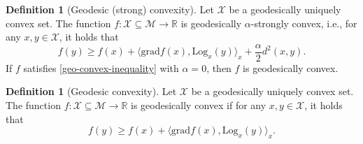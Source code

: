 \documentclass{article}
\newcommand{\rgrad}{\mathrm{grad}}
\newcommand{\Log}{\mathrm{Log}}
\theoremstyle{plain}
\theoremstyle{definition}
\newtheorem{definition}[theorem]{Definition}
\theoremstyle{remark}
\begin{document}
\begin{definition}[Geodesic (strong) convexity]\label{as:strongcon}
Let $\mathcal{X}$ be a geodesically uniquely convex set. The function $f : \mathcal{X}\subseteq\mathcal{M} \to \mathbb{R}$ is geodesically $\alpha$-strongly convex, i.e., for any $x, y \in \mathcal{X}$, it holds that
\begin{equation}\label{geo-convex-inequality}
f(y) \geq f(x) + \langle \rgrad f(x), \Log_x(y) \rangle_x + \frac{\alpha}{2} d^2(x, y).
\end{equation}
If $f$ satisfies \eqref{geo-convex-inequality} with $\alpha=0$, then $f$ is geodesically convex.
\end{definition}
\iffalse
\begin{definition}[Geodesic convexity]\label{as:conv}
Let $\mathcal{X}$ be a geodesically uniquely convex set. The function $f : \mathcal{X}\subseteq\mathcal{M} \to \mathbb{R}$ is geodesically convex if for any $x, y \in \mathcal{X}$, it holds that
\begin{equation}\label{geo-convex-inequality}
f(y) \geq f(x) + \langle \rgrad f(x), \Log_x(y) \rangle_x.
\end{equation}
\end{definition}
\end{document}
